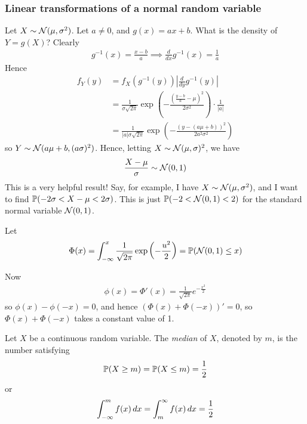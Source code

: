 \documentclass{../template/note}
\begin{document}
    \subsubsection{Linear transformations of a normal random variable}

    Let \(X \sim \mathcal{N}(\mu, \sigma^2)\). Let \(a \neq 0\), and \(g(x) = ax + b\). What is the density of \(Y = g(X)\)? Clearly
    \begin{align*}
        g^{-1}(x) = \frac{x-b}a \implies \frac d{dx}g^{-1}(x) = \frac 1 a
    \end{align*}
    Hence
    \begin{align*}
        f_Y(y) &= f_X(g^{-1}(y)) \left|\frac{d}{dy}g^{-1}(y)\right| \\
        &= \frac{1}{\sigma \sqrt{2\pi}} \exp\left(-\frac{(\frac{y-b}{a}-\mu)^2}{2\sigma^2}\right) \cdot \frac 1 {|a|} \\
        &= \frac{1}{|a|\sigma \sqrt{2\pi}} \exp\left(-\frac{(y-(a\mu+b))^2}{2a^2\sigma^2}\right)
    \end{align*}
    so \(Y \sim \mathcal{N}(a\mu+b, (a\sigma)^2)\). Hence, letting \(X \sim \mathcal{N}(\mu, \sigma)^2\), we have
    \begin{align*}
        \frac{X-\mu}{\sigma} \sim \mathcal{N}(0, 1)
    \end{align*}
    This is a very helpful result! Say, for example, I have \(X \sim \mathcal{N}(\mu, \sigma^2)\), and I want to find \(\mathbb P(-2\sigma < X-\mu < 2\sigma)\). This is just \(\mathbb P(-2 < \mathcal{N}(0, 1) < 2)\) for the standard normal variable \(\mathcal{N}(0, 1)\). 

    \begin{definition}
        Let 
        \begin{align*}
            \Phi(x) = \int_{-\infty}^x \frac{1}{\sqrt{2\pi}} \exp\left(-\frac{u^2}2\right) = \mathbb P(\mathcal{N}(0, 1) \leq x)
        \end{align*}
    \end{definition}
    Now
    \begin{align*}
        \phi(x) = \Phi'(x) = \frac{1}{\sqrt{2\pi}}e^{-\frac{x^2}2}
    \end{align*}
    so \(\phi(x) - \phi(-x) = 0\), and hence \((\Phi(x)+\Phi(-x))' = 0\), so \(\Phi(x) + \Phi(-x)\) takes a constant value of 1.
    
    \begin{definition}[Median]
        Let \(X\) be a continuous random variable. The \emph{median} of \(X\), denoted by \(m\), is the number satisfying
        \begin{align*}
            \mathbb P(X \geq m) = \mathbb P(X \leq m) = \frac 1 2
        \end{align*}
        or
        \begin{align*}
            \int_{-\infty}^m f(x) \,d{x} = \int_m^\infty f(x) \,d{x} = \frac 1 2
        \end{align*}
    \end{definition}
    
\end{document}
